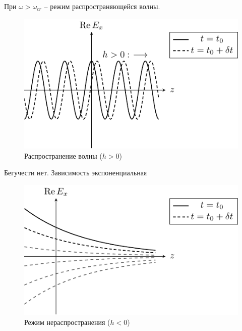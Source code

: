 \documentclass[a4paper,14pt]{extarticle}
\renewcommand{\phi}{\varphi}
\begin{document}
При  $\omega > \omega_{cr}$ -- режим распространяющейся волны.

%

\begin{figure}[h!]
	\centering
	\includegraphics[scale=1]{img/lect3_ris1}
	\caption{Распространение волны ($h>0$)}
	\label{fig:lect3:1}
\end{figure}


Бегучести нет.
Зависимость экспоненциальная
\begin{figure}[h!]
	\centering
	\includegraphics[scale=1]{img/lect3_ris2}
	\caption{Режим нераспространения ($h<0$)}
	\label{fig:lect3:2}
\end{figure}
\end{document}
